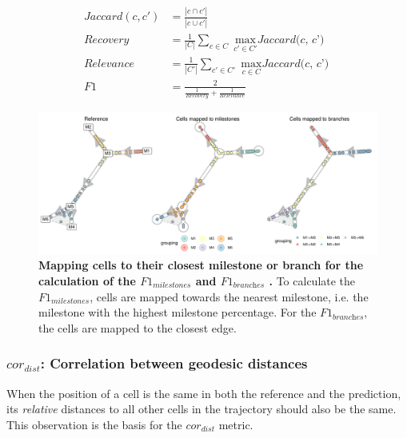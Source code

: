 \begin{align*}
\textit{Jaccard}(c, c') &= \frac{|c \cap c'|}{|c \cup c'|} \\
\textit{Recovery} &= \frac{1}{|C|} \sum_{c \in C}{\max_{c' \in C'}{\textit{Jaccard(c, c')}}} \\
\textit{Relevance} &= \frac{1}{|C'|} \sum_{c' \in C'}{\max_{c \in C}{\textit{Jaccard(c, c')}}} \\
\textit{F1} &= \frac{2}{\frac{1}{\textit{Recovery}} + \frac{1}{\textit{Relevance}}}
\end{align*}

\begin{figure}[tbh!]
	\centering\includegraphics[width=\linewidth]{fig/snote1fig_3.pdf}
	\caption{
		\textbf{Mapping cells to their closest milestone or branch for the calculation of the {$\textit{F1}_{\textit{milestones}}$} and {$\textit{F1}_{\textit{branches}}$} .}
		To calculate the {$\textit{F1}_{\textit{milestones}}$}, cells are mapped towards the nearest milestone, i.e. the milestone with the highest milestone percentage. For the {$\textit{F1}_{\textit{branches}}$}, the cells are mapped to the closest edge.
	}
	\label{fig:snote1fig_3}
\end{figure}

\subsubsection{$\textit{cor}_{\textit{dist}}$: Correlation between geodesic distances}

When the position of a cell is the same in both the reference and the prediction, its \textit{relative} distances to all other cells in the trajectory should also be the same. This observation is the basis for the $\textit{cor}_{\textit{dist}}$ metric.

